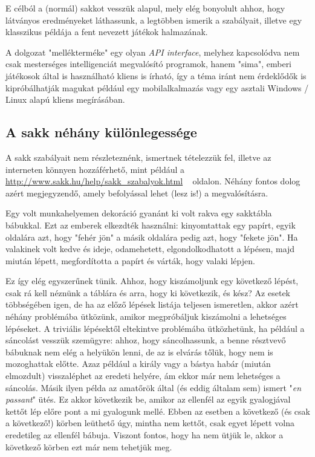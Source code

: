 \documentclass[twoside, a4paper, 12pt]{article}
\begin{document}
E célból a (normál) sakkot vesszük alapul, mely elég bonyolult ahhoz, hogy látványos eredményeket láthassunk, a legtöbben ismerik a szabályait, illetve egy klasszikus példája a fent nevezett játékok halmazának.

A dolgozat "mellékterméke" egy olyan \textit{API interface}, melyhez kapcsolódva nem csak mesterséges intelligenciát megvalósító programok, hanem "sima", emberi játékosok által is használható kliens is írható, így a téma iránt nem érdeklődők is kipróbálhatják magukat például egy mobilalkalmazás vagy egy asztali Windows / Linux alapú kliens megírásában.

\subsection{A sakk néhány különlegessége}
A sakk szabályait nem részleteznénk, ismertnek tételezzük fel, illetve az interneten könnyen hozzáférhető, mint például a \url{http://www.sakk.hu/help/sakk_szabalyok.html} ~\cite{chessrulessakkhu} oldalon. Néhány fontos dolog azért megjegyzendő, amely befolyással lehet (lesz is!) a megvalósításra.

Egy volt munkahelyemen dekoráció gyanánt ki volt rakva egy sakktábla bábukkal. Ezt az emberek elkezdték használni: kinyomtattak egy papírt, egyik oldalára azt, hogy "fehér jön" a másik oldalára pedig azt, hogy "fekete jön". Ha valakinek volt kedve és ideje, odamehetett, elgondolkodhatott a lépésen, majd miután lépett, megfordította a papírt és várták, hogy valaki lépjen.

Ez így elég egyszerűnek tünik. Ahhoz, hogy kiszámoljunk egy következő lépést, csak rá kell néznünk a táblára és arra, hogy ki következik, és kész? Az esetek többségében igen, de ha az előző lépések listája teljesen ismeretlen, akkor azért néhány problémába ütközünk, amikor megpróbáljuk kiszámolni a lehetséges lépéseket. A triviális lépésektől eltekintve problémába ütközhetünk, ha például a sáncolást vesszük szemügyre: ahhoz, hogy sáncolhassunk, a benne résztvevő bábuknak nem elég a helyükön lenni, de az is elvárás tőlük, hogy nem is mozoghattak előtte. Azaz például a király vagy a bástya habár (miután elmozdult) visszaléphet az eredeti helyére, ám ekkor már nem lehetséges a sáncolás. Másik ilyen példa az amatőrök által (és eddig általam sem) ismert "\textit{en passant}" ütés. Ez akkor következik be, amikor az ellenfél az egyik gyalogjával kettőt lép előre pont a mi gyalogunk mellé. Ebben az esetben a következő (és csak a következő!) körben leüthető úgy, mintha nem kettőt, csak egyet lépett volna eredetileg az ellenfél bábuja. Viszont fontos, hogy ha nem ütjük le, akkor a következő körben ezt már nem tehetjük meg.
\end{document}
